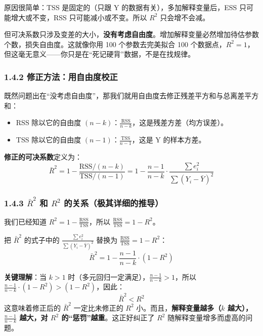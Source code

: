 \documentclass[12pt,a4paper]{ctexart}
\begin{document}
原因很简单：TSS 是固定的（只跟 Y 的数据有关），多加解释变量后，ESS 只可能增大或不变，RSS 只可能减小或不变。所以 \(R^2\) 只会增不会减。

但可决系数只涉及变差的大小，\textbf{没有考虑自由度}。增加解释变量必然增加待估参数个数，损失自由度。这就像你用 100 个参数去完美拟合 100 个数据点，\(R^2 = 1\)，但这毫无意义——你只是在“死记硬背”数据，不是在找规律。

\subsubsection{1.4.2 修正方法：用自由度校正}

既然问题出在“没考虑自由度”，那我们就用自由度去修正残差平方和与总离差平方和：
\begin{itemize}
    \item RSS 除以它的自由度 \((n-k)\)：\(\frac{\text{RSS}}{n-k}\)，这是残差方差（均方误差）。
    \item TSS 除以它的自由度 \((n-1)\)：\(\frac{\text{TSS}}{n-1}\)，这是 Y 的样本方差。
\end{itemize}

\textbf{修正的可决系数}定义为：
\begin{equation}
\bar{R}^2 = 1 - \frac{\text{RSS}/(n-k)}{\text{TSS}/(n-1)} = 1 - \frac{n-1}{n-k} \cdot \frac{\sum e_i^2}{\sum(Y_i - \bar{Y})^2} \tag{3.44}
\end{equation}

\subsubsection{1.4.3 \(\bar{R}^2\) 和 \(R^2\) 的关系（极其详细的推导）}

我们已经知道 \(R^2 = 1 - \frac{\text{RSS}}{\text{TSS}}\)，所以 \(\frac{\text{RSS}}{\text{TSS}} = 1 - R^2\)。

把 \(\bar{R}^2\) 的式子中的 \(\frac{\sum e_i^2}{\sum(Y_i - \bar{Y})^2}\) 替换为 \(\frac{\text{RSS}}{\text{TSS}} = 1 - R^2\)：
\begin{equation}
\bar{R}^2 = 1 - \frac{n-1}{n-k} \cdot (1 - R^2) \tag{3.45}
\end{equation}

\textbf{关键理解}：当 \(k > 1\) 时（多元回归一定满足），\(\frac{n-1}{n-k} > 1\)，所以 \(\frac{n-1}{n-k} \cdot (1 - R^2) > (1 - R^2)\)，因此：
\[
\bar{R}^2 < R^2
\]
这意味着修正后的 \(\bar{R}^2\) 一定比未修正的 \(R^2\) 小。而且，\textbf{解释变量越多（\(k\) 越大），\(\frac{n-1}{n-k}\) 越大，对 \(R^2\) 的“惩罚”越重}。这正好纠正了 \(R^2\) 随解释变量增多而虚高的问题。
\end{document}

